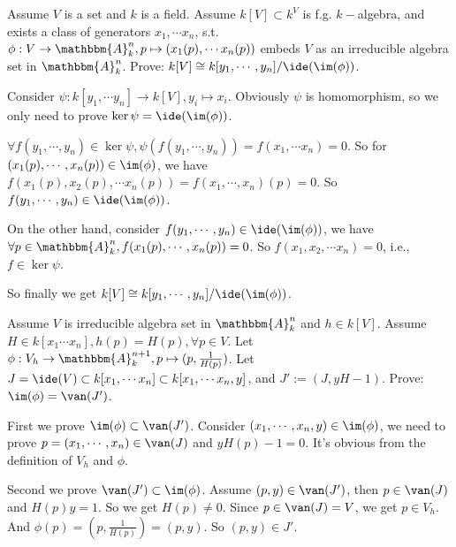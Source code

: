 \documentclass{ctexart}
\newif\ifpreface
\begin{document}
\large
\setlength{\baselineskip}{1.2em}
\ifpreface
	
	\newgeometry{left=2cm,right=2cm,top=2cm,bottom=2cm}
\else
	\maketitle
\fi
\begin{problem}
Assume $V$ is a set and $k$ is a field.
Assume $k[V]\subset k^V$ is f.g. $k-$algebra, and exists a class of generators $x_1,\cdots x_n$, s.t. $\phi:V\to \mathbbm{A}_k^n,p\mapsto (x_1(p),\cdots x_n(p))$ embeds $V$ as an irreducible algebra set in $\mathbbm{A}_k^n$.
Prove: $k[V]\cong k[y_1,\cdots,y_n]/\ide(\im(\phi))$.
\end{problem}

\begin{solution}
	Consider $\psi:k[y_1,\cdots y_n]\to k[V],y_i\mapsto x_i$. Obviously $\psi$ is homomorphism, so we only need to prove $\ker \psi = \ide (\im(\phi))$.

	$\forall f(y_1,\cdots,y_n)\in\ker\psi,\psi(f(y_1,\cdots,y_n))=f(x_1,\cdots x_n)=0$. So for $(x_1(p),\cdots,x_n(p))\in\im(\phi)$, we have $f(x_1(p),x_2(p),\cdots x_n(p))=f(x_1,\cdots,x_n)(p)=0$. So $f(y_1,\cdots,y_n)\in \ide(\im(\phi))$.

	On the other hand, consider $f(y_1,\cdots,y_n)\in \ide(\im(\phi))$, we have $\forall p\in \mathbbm{A}_k^n,f(x_1(p),\cdots ,x_n(p))=0$. So $f(x_1,x_2,\cdots x_n)=0$, i.e., $f\in\ker \psi$.

	So finally we get $k[V]\cong k[y_1,\cdots,y_n]/\ide(\im(\phi))$.
\end{solution}

\begin{problem}
Assume $V$ is irreducible algebra set in $\mathbbm{A}_k^n$ and $h\in k[V]$.
Assume $H\in k[x_1\cdots x_n],h(p)=H(p),\forall p\in V$.
Let $\phi:V_h\to \mathbbm{A}_k^{n+1},p\mapsto (p,\frac{1}{H(p)})$.
Let $J=\ide(V)\subset k[x_1,\cdots x_n]\subset k[x_1,\cdots x_n,y]$,
and $J':=(J,yH-1)$.
Prove: $\im(\phi)=\van(J')$.
\end{problem}

\begin{solution}
	First we prove $\im(\phi)\subset \van(J')$.
	Consider $(x_1,\cdots ,x_n,y)\in\im(\phi)$, we need to prove $p=(x_1,\cdots,x_n)\in \van(J)$ and $yH(p)-1=0$.
	It's obvious from the definition of $V_h$ and $\phi$.

	Second we prove $\van(J')\subset \im(\phi)$.
	Assume $(p,y)\in \van(J')$, then $p\in \van(J)$ and $H(p)y=1$.
	So we get $H(p)\neq 0$. Since $p\in\van(J)=V$, we get $p\in V_h$.
	And $\phi(p)=(p,\frac{1}{H(p)})=(p,y)$. So $(p,y)\in J'$.
\end{solution}
\begin{problem}

\end{problem}
\end{document}
